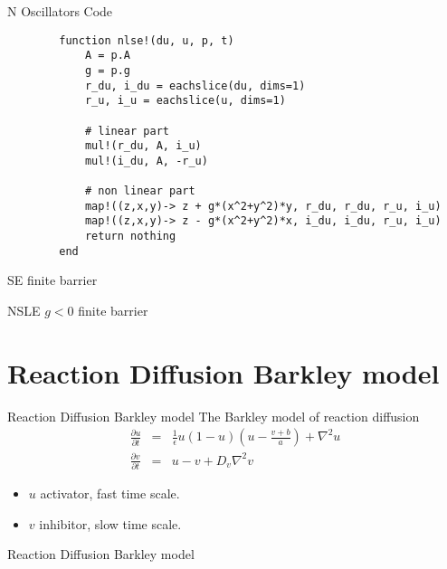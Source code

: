 \documentclass[aspectratio=169]{beamer}
\begin{document}
\begin{frame}[fragile]{N Oscillators Code}
    \begin{verbatim}
        function nlse!(du, u, p, t)
            A = p.A
            g = p.g
            r_du, i_du = eachslice(du, dims=1)
            r_u, i_u = eachslice(u, dims=1)

            # linear part 
            mul!(r_du, A, i_u)
            mul!(i_du, A, -r_u)

            # non linear part 
            map!((z,x,y)-> z + g*(x^2+y^2)*y, r_du, r_du, r_u, i_u)
            map!((z,x,y)-> z - g*(x^2+y^2)*x, i_du, i_du, r_u, i_u)
            return nothing
        end
    \end{verbatim}
\end{frame}

\begin{frame}{SE finite barrier}
    \centering
\end{frame}

\begin{frame}{NSLE $g<0$ finite barrier}
    \centering
\end{frame}


\section{Reaction Diffusion Barkley model}

\begin{frame}{Reaction Diffusion Barkley model}
    The Barkley model of reaction diffusion
    \begin{eqnarray}
        \frac{\partial u}{\partial t} & = & \frac{1}{\epsilon} u (1-u)\left(u - \frac{v+b}{a}\right) + \nabla^2 u \\
        \frac{\partial v}{\partial t} & = & u - v + D_v \nabla^2 v
    \end{eqnarray}
    \pause
    \begin{itemize}
        \item $u$ activator, fast time scale.
        \item $v$ inhibitor, slow time scale.
    \end{itemize}
\end{frame}

\begin{frame}{Reaction Diffusion Barkley model}
    \centering
\end{frame}
\end{document}
